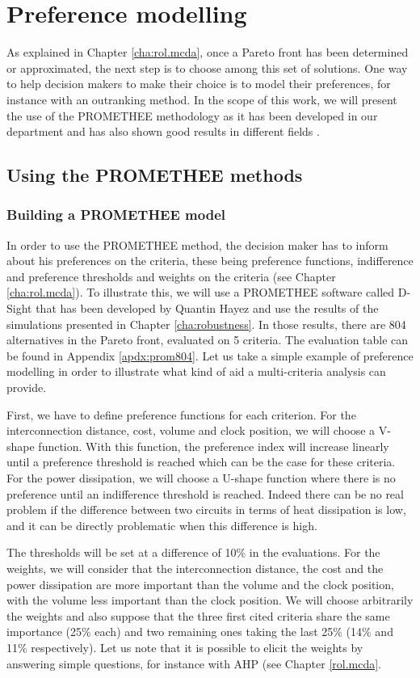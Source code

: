 \section{Preference modelling}
As explained in Chapter \ref{cha:rol.mcda}, once a Pareto front has been determined or approximated, the next step is to choose among this set of solutions. One way to help decision makers to make their choice is to model their preferences, for instance with an outranking method. In the scope of this work, we will present the use of the PROMETHEE methodology as it has been developed in our department and has also shown good results in different fields \cite{Beh2010}.

\subsection{Using the PROMETHEE methods}

\subsubsection{Building a PROMETHEE model}
In order to use the PROMETHEE method, the decision maker has to inform about his preferences on the criteria, these being preference functions, indifference and preference thresholds and weights on the criteria (see Chapter \ref{cha:rol.mcda}). To illustrate this, we will use a PROMETHEE software called D-Sight that has been developed by Quantin Hayez and use the results of the simulations presented in Chapter \ref{cha:robustness}. In those results, there are 804 alternatives in the Pareto front, evaluated on 5 criteria. The evaluation table can be found in Appendix \ref{apdx:prom804}. Let us take a simple example of preference modelling in order to illustrate what kind of aid a multi-criteria analysis can provide.

First, we have to define preference functions for each criterion. For the interconnection distance, cost, volume and clock position, we will choose a V-shape function. With this function, the preference index will increase linearly until a preference threshold is reached which can be the case for these criteria. For the power dissipation, we will choose a U-shape function where there is no preference until an indifference threshold is reached. Indeed there can be no real problem if the difference between two circuits in terms of heat dissipation is low, and it can be directly problematic when this difference is high.

The thresholds will be set at a difference of 10\% in the evaluations. For the weights, we will consider that the interconnection distance, the cost and the power dissipation are more important than the volume and the clock position, with the volume less important than the clock position. We will choose arbitrarily the weights and also suppose that the three first cited criteria share the same importance (25\% each) and two remaining ones taking the last 25\% (14\% and 11\% respectively). Let us note that it is possible to elicit the weights by answering simple questions, for instance with AHP (see Chapter \ref{rol.mcda}.

